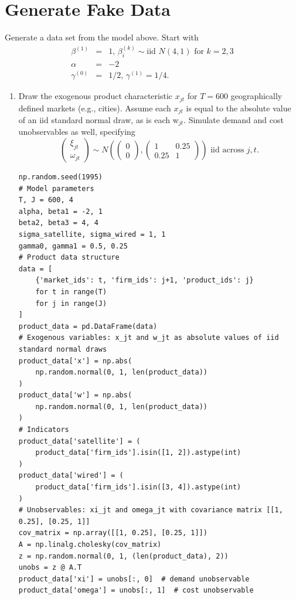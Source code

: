 \documentclass[english,11pt]{article}
\begin{document}
\section{Generate Fake Data}

Generate a data set from the model above. Start with%
\begin{eqnarray*}
\beta ^{(1)} &=&1\text{, }\beta _{i}^{\left( k\right) }\sim \text{iid }%
N\left( 4,1\right) \text{ for }k=2,3 \\
\alpha  &=&-2 \\
\gamma ^{(0)} &=&1/2\text{, }\gamma ^{(1)}=1/4.
\end{eqnarray*}

\begin{enumerate}
\item Draw the exogenous product characteristic $x_{jt}$ for $T=600$
geographically defined markets (e.g., cities). Assume each $x_{jt}$ is equal
to the absolute value of an iid standard normal draw, as is each w$_{jt}$.
Simulate demand and cost unobservables as well, specifying
\begin{equation*}
\left(
\begin{array}{c}
\xi _{jt} \\
\omega _{jt}%
\end{array}%
\right) \sim N\left( \left(
\begin{array}{c}
0 \\
0%
\end{array}%
\right) ,\left(
\begin{array}{cc}
1 & 0.25 \\
0.25 & 1%
\end{array}%
\right) \right) \text{ iid across }j,t.
\end{equation*}


\begin{verbatim}
np.random.seed(1995)
# Model parameters
T, J = 600, 4
alpha, beta1 = -2, 1
beta2, beta3 = 4, 4  
sigma_satellite, sigma_wired = 1, 1
gamma0, gamma1 = 0.5, 0.25
# Product data structure
data = [
    {'market_ids': t, 'firm_ids': j+1, 'product_ids': j} 
    for t in range(T) 
    for j in range(J)
]
product_data = pd.DataFrame(data)
# Exogenous variables: x_jt and w_jt as absolute values of iid standard normal draws
product_data['x'] = np.abs(
    np.random.normal(0, 1, len(product_data))
)
product_data['w'] = np.abs(
    np.random.normal(0, 1, len(product_data))
)
# Indicators
product_data['satellite'] = (
    product_data['firm_ids'].isin([1, 2]).astype(int)
)
product_data['wired'] = (
    product_data['firm_ids'].isin([3, 4]).astype(int)
)
# Unobservables: xi_jt and omega_jt with covariance matrix [[1, 0.25], [0.25, 1]]
cov_matrix = np.array([[1, 0.25], [0.25, 1]])
A = np.linalg.cholesky(cov_matrix)
z = np.random.normal(0, 1, (len(product_data), 2))
unobs = z @ A.T
product_data['xi'] = unobs[:, 0]  # demand unobservable
product_data['omega'] = unobs[:, 1]  # cost unobservable
\end{verbatim}


\end{enumerate}
\end{document}
